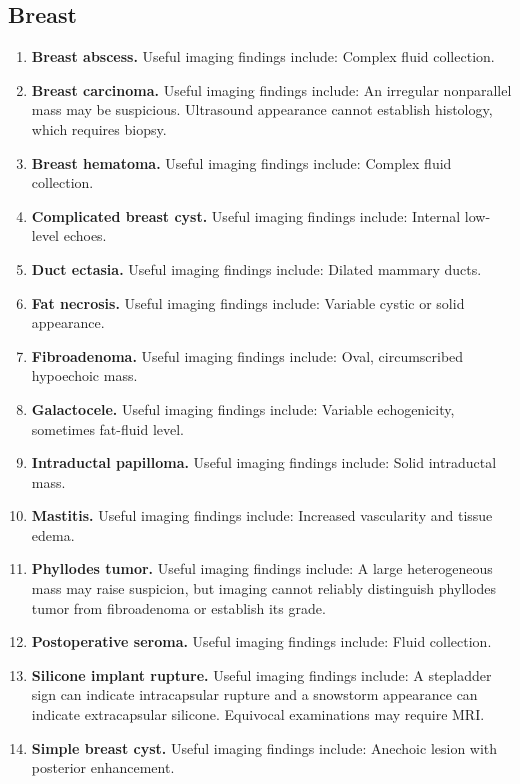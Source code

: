 \subsection{Breast}
\begin{enumerate}[leftmargin=*,itemsep=0.45em,topsep=0.4em]
\item \textbf{Breast abscess.} Useful imaging findings include: Complex fluid collection.
\item \textbf{Breast carcinoma.} Useful imaging findings include: An irregular nonparallel mass may be suspicious. Ultrasound appearance cannot establish histology, which requires biopsy.
\item \textbf{Breast hematoma.} Useful imaging findings include: Complex fluid collection.
\item \textbf{Complicated breast cyst.} Useful imaging findings include: Internal low-level echoes.
\item \textbf{Duct ectasia.} Useful imaging findings include: Dilated mammary ducts.
\item \textbf{Fat necrosis.} Useful imaging findings include: Variable cystic or solid appearance.
\item \textbf{Fibroadenoma.} Useful imaging findings include: Oval, circumscribed hypoechoic mass.
\item \textbf{Galactocele.} Useful imaging findings include: Variable echogenicity, sometimes fat-fluid level.
\item \textbf{Intraductal papilloma.} Useful imaging findings include: Solid intraductal mass.
\item \textbf{Mastitis.} Useful imaging findings include: Increased vascularity and tissue edema.
\item \textbf{Phyllodes tumor.} Useful imaging findings include: A large heterogeneous mass may raise suspicion, but imaging cannot reliably distinguish phyllodes tumor from fibroadenoma or establish its grade.
\item \textbf{Postoperative seroma.} Useful imaging findings include: Fluid collection.
\item \textbf{Silicone implant rupture.} Useful imaging findings include: A stepladder sign can indicate intracapsular rupture and a snowstorm appearance can indicate extracapsular silicone. Equivocal examinations may require MRI.
\item \textbf{Simple breast cyst.} Useful imaging findings include: Anechoic lesion with posterior enhancement.
\end{enumerate}

